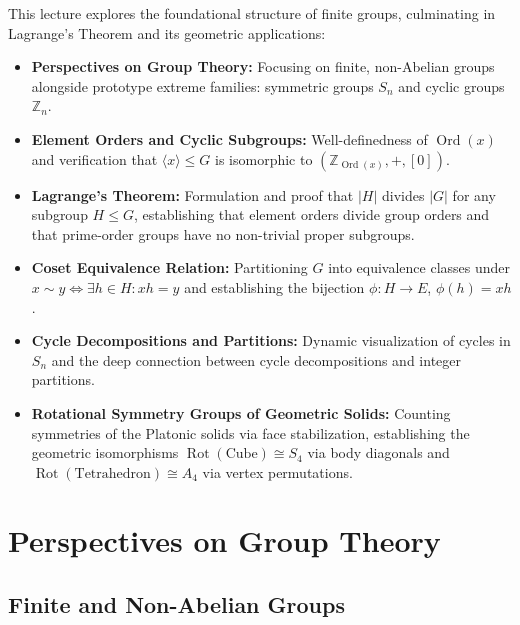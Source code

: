 \begin{overview}
This lecture explores the foundational structure of finite groups, culminating in Lagrange's Theorem and its geometric applications:
\begin{itemize}
    \item \textbf{Perspectives on Group Theory:} Focusing on finite, non-Abelian groups alongside prototype extreme families: symmetric groups $S_n$ and cyclic groups $\mathbb{Z}_n$.
    \item \textbf{Element Orders and Cyclic Subgroups:} Well-definedness of $\operatorname{Ord}(x)$ and verification that $\langle x \rangle \le G$ is isomorphic to $(\mathbb{Z}_{\operatorname{Ord}(x)}, +, [0])$.
    \item \textbf{Lagrange's Theorem:} Formulation and proof that $|H|$ divides $|G|$ for any subgroup $H \le G$, establishing that element orders divide group orders and that prime-order groups have no non-trivial proper subgroups.
    \item \textbf{Coset Equivalence Relation:} Partitioning $G$ into equivalence classes under $x \sim y \iff \exists h \in H \colon xh = y$ and establishing the bijection $\phi \colon H \to E$, $\phi(h) = xh$.
    \item \textbf{Cycle Decompositions and Partitions:} Dynamic visualization of cycles in $S_n$ and the deep connection between cycle decompositions and integer partitions.
    \item \textbf{Rotational Symmetry Groups of Geometric Solids:} Counting symmetries of the Platonic solids via face stabilization, establishing the geometric isomorphisms $\operatorname{Rot}(\text{Cube}) \cong S_4$ via body diagonals and $\operatorname{Rot}(\text{Tetrahedron}) \cong A_4$ via vertex permutations.
\end{itemize}
\end{overview}

\section{Perspectives on Group Theory}

\subsection{Finite and Non-Abelian Groups}

